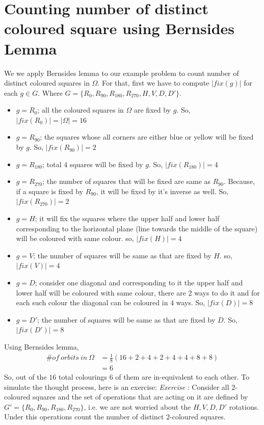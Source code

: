 \section{Counting number of distinct coloured square using Bernsides Lemma}
We we apply Bernsides lemma to our example problem to count number of distinct coloured squares in $\Omega$. For that, first we have to compute $|fix(g)|$ for each $g\in G$. Where $G=\{R_0,R_{90},R_{180},R_{270},H,V,D,D'\}  $.
\begin{itemize}
\item $g=R_0$; all the coloured squares in $\Omega$ are fixed by $g$. So, $|fix(R_0)|=|\Omega|=16$
\item $g=R_{90}$; the squares whose all corners are either blue or yellow will be fixed by $g$. So, $|fix(R_{90})|=2 $
\item $g=R_{180}$; total $4$ squares will be fixed  by $g$. So, $|fix(R_{180})|=4 $
\item $g=R_{270}$; the number of squares that will be fixed are same as $R_{90}$. Because, if a square is fixed by $R_{90}$, it will be fixed by it's inverse as well. So, $|fix(R_{270})|=2 $
\item $g=H$; it will fix the squares where the upper half and lower half corresponding to the horizontal plane (line towards the middle of the square) will be coloured with same colour. so, $|fix(H)|=4 $
\item $g=V$; the number of squares will be same as that are fixed by $H$. so, $|fix(V)|=4 $
\item $g=D$; consider one diagonal and corresponding to it the upper half and lower half will be coloured with same colour, there are $2$ ways to do it and for each such colour the diagonal can be coloured in $4$ ways. So, $|fix(D)|=8 $
\item $g=D'$; the number of squares will be same as that are fixed by $D$. So, $|fix(D')|=8$
\end{itemize}
Using Bernsides lemma,
\begin{align*}
\#of \ orbits \ in \ \Omega&=\frac{1}{8}(16+2+4+2+4+4+8+8)\\
&=6
\end{align*}
So, out of the $16$ total colourings $6$ of them are in-equivalent to each other. To simulate the thought process, here is an exercise:
\emph{Exercise} : Consider all $2$-coloured squares and the set of operations that are acting on it are defined by $G'=\{R_0,R_{90},R_{180},R_{270}\}$, i.e. we are not worried about the $H,V,D,D'$ rotations. Under this operations count the number of distinct $2$-coloured squares. 
\\

